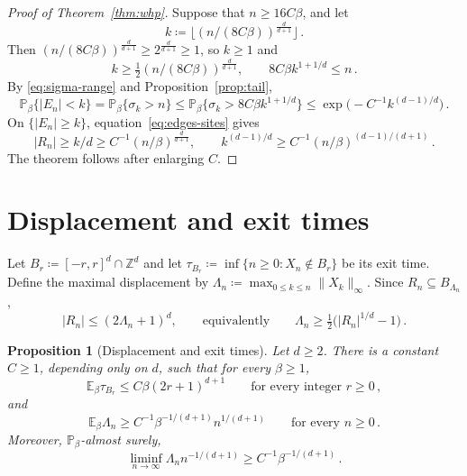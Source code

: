 \documentclass[11pt]{amsart}
\theoremstyle{plain}
\newtheorem{proposition}[theorem]{Proposition}
\theoremstyle{definition}
\newcommand{\Z}{\mathbb Z}
\renewcommand{\P}{\mathbb P}
\newcommand{\E}{\mathbb E}
\begin{document}
	\begin{proof}[Proof of Theorem~\ref{thm:whp}]
		Suppose that $n\geq16C\beta$, and let
		\[
		k\coloneqq\lfloor(n/(8C\beta))^{\frac{d}{d+1}}\rfloor\, .
		\]
		Then $(n/(8C\beta))^{\frac{d}{d+1}}\geq2^{\frac{d}{d+1}}\geq1$, so $k\geq1$ and
		\[
		k\geq\tfrac12(n/(8C\beta))^{\frac{d}{d+1}},
		\qquad 8C\beta k^{1+1/d}\leq n\, .
		\]
		By \eqref{eq:sigma-range} and
		Proposition~\ref{prop:tail},
		\[
			\P_\beta\{|E_n|<k\}
			=\P_\beta\{\sigma_k>n\}
			\leq\P_\beta\bigl\{\sigma_k>8C\beta k^{1+1/d}\bigr\}
			\leq\exp\bigl(-C^{-1}k^{(d-1)/d}\bigr)\, .
		\]
		On $\{|E_n|\geq k\}$, equation~\eqref{eq:edges-sites} gives
		\[
		|R_n|\geq k/d\geq C^{-1}(n/\beta)^{\frac{d}{d+1}},
		\qquad k^{(d-1)/d}\geq C^{-1}(n/\beta)^{(d-1)/(d+1)}\, .
		\]
		The theorem follows after
		enlarging $C$.
	\end{proof}

	\section{Displacement and exit times}\label{sec:displacement}

	Let $B_r\coloneqq[-r,r]^d\cap\Z^d$ and let
	$\tau_{B_r}\coloneqq\inf\{n\geq0:X_n\notin B_r\}$ be its exit time.
	Define the maximal displacement by
	$\Lambda_n\coloneqq\max_{0\leq k\leq n}\|X_k\|_\infty$.
	Since $R_n\subseteq B_{\Lambda_n}$,
	\begin{equation}\label{eq:range-box}
		|R_n|\leq(2\Lambda_n+1)^d,
		\qquad\text{equivalently}\qquad
		\Lambda_n\geq\tfrac12\bigl(|R_n|^{1/d}-1\bigr)\, .
	\end{equation}

	\begin{proposition}[Displacement and exit times]\label{prop:displacement}
		Let $d\geq2$.  There is a constant $C\geq1$, depending only
		on $d$, such that for every $\beta\geq1$,
		\[
		\E_\beta\tau_{B_r}\leq C\beta(2r+1)^{d+1}
		\qquad\text{for every integer }r\geq0\, ,
		\]
		and
		\[
		\E_\beta\Lambda_n\geq C^{-1}\beta^{-1/(d+1)}n^{1/(d+1)}
		\qquad\text{for every }n\geq0\, .
		\]
		Moreover, $\P_\beta$-almost surely, \[
		\liminf_{n\to\infty}\Lambda_nn^{-1/(d+1)}\geq C^{-1}\beta^{-1/(d+1)}\, . \]
	\end{proposition}
\end{document}
